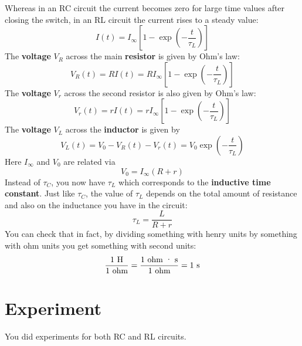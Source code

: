 Whereas in an RC circuit the current becomes zero for large time values after closing the switch, in an RL circuit the current rises to a steady value:
\begin{equation}
    I(t) = I_{\infty} \left[ 1 - \exp\left(- \frac{t}{\tau_{L}}\right) \right]
    \label{eq.05.RL.i.rise}
\end{equation}
The \textbf{voltage} $V_{R}$ across the main \textbf{resistor} is given by Ohm's law:
\begin{equation}
    V_{R}(t) = R I(t) = R I_{\infty} \left[ 1 - \exp\left(- \frac{t}{\tau_{L}}\right) \right]
    \label{eq.05.RL.vR}
\end{equation}
The \textbf{voltage} $V_{r}$ across the second resistor is also given by Ohm's law:
\begin{equation}
    V_{r}(t) = r I(t) = r I_{\infty} \left[ 1 - \exp\left(- \frac{t}{\tau_{L}}\right) \right]
    \label{eq.05.RL.vr}
\end{equation}
The \textbf{voltage} $V_{L}$ across the \textbf{inductor} is given by
\begin{equation}
    V_{L}(t) = V_{0} - V_{R}(t) - V_{r}(t) = V_{0} \exp\left(- \frac{t}{\tau_{L}}\right)
    \label{eq.05.RL.vL}
\end{equation}
Here $I_{\infty}$ and $V_{0}$ are related via
\begin{equation}
    V_{0} = I_{\infty} \left(R + r\right)
\end{equation}
Instead of $\tau_{C}$, you now have $\tau_{L}$ which corresponds to the \textbf{inductive time constant}. Just like $\tau_{C}$, the value of $\tau_{L}$ depends on the total amount of resistance and also on the inductance you have in the circuit:
\begin{equation}
    \tau_{L} = \frac{L}{R + r}
    \label{eq.05.tauL}
\end{equation}
You can check that in fact, by dividing something with henry units by something with ohm units you get something with second units:
\begin{equation}
    \frac{1 \ \text{H}}{1 \ \text{ohm}} = \frac{1 \ \text{ohm{ }\textperiodcentered{ }s}}{1 \ \text{ohm}} = 1 \ \text{s}
\end{equation}
%
\section{Experiment}
%
You did experiments for both RC and RL circuits.
%
